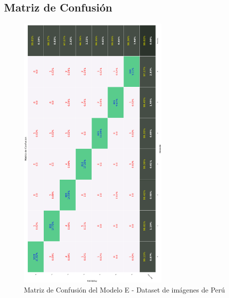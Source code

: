 	 	\subsection{Matriz de Confusión}  
			\begin{figure}[H]
				\begin{center}
				\includegraphics[width=0.65\textwidth]{images/desarrollo/testResults/peru/modelE_} 
				\end{center}
				\begin{center}
				\caption{\small{Matriz de Confusión del Modelo E - Dataset de imágenes de Perú}}
				
				{\small{\fontsize{10}{16.8}\selectfont {Fuente: Elaboración propia}}}
				\end{center}
				\vspace{-1.5em}
			\end{figure}
